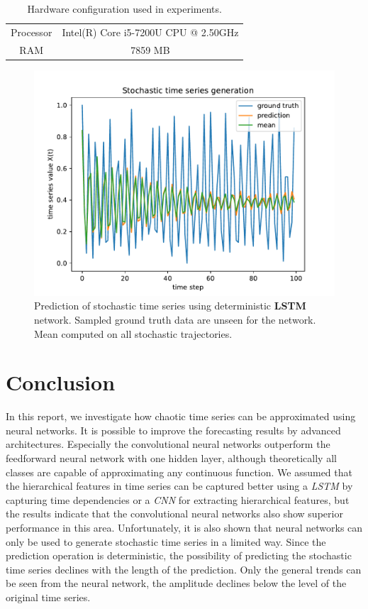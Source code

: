 \documentclass{article}
\begin{document}
\begin{table}
  \centering
  \begin{tabular}{cc}
    Processor & Intel(R) Core i5-7200U CPU @ 2.50GHz \\
    RAM       & 7859 MB                              \\
  \end{tabular}
  \caption{Hardware configuration used in experiments.}
  \label{tab:hardware}
\end{table}

\begin{figure}
  \centering
  \includegraphics[width=\textwidth]{figures/nn_limitation.pdf}
  \caption{Prediction of stochastic time series using deterministic
    \textbf{LSTM} network. Sampled ground truth data are unseen for the network.
    Mean computed on all stochastic trajectories.}
  \label{fig:nn_limitation}
\end{figure}

\section{Conclusion}

In this report, we investigate how chaotic time series can be approximated
using neural networks. It is possible to improve the forecasting results by
advanced architectures. Especially the convolutional neural networks
outperform the feedforward neural network with one hidden layer,
although theoretically all classes are capable of approximating any continuous
function. We assumed that the hierarchical features in time series can be
captured better using a \emph{LSTM} by capturing time dependencies or a
\emph{CNN} for extracting hierarchical features, but the results indicate that
the convolutional neural networks also show superior performance in this area.
Unfortunately, it is also shown that neural networks can only be used to
generate stochastic time series in a limited way. Since the prediction operation
is deterministic, the possibility of predicting the stochastic time series
declines with the length of the prediction. Only the general trends can be seen
from the neural network, the amplitude declines below the level of the
original time series.



\end{document}
